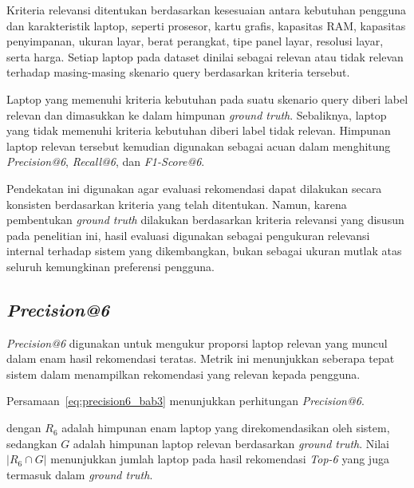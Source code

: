 Kriteria relevansi ditentukan berdasarkan kesesuaian antara kebutuhan pengguna dan karakteristik laptop, seperti prosesor, kartu grafis, kapasitas RAM, kapasitas penyimpanan, ukuran layar, berat perangkat, tipe panel layar, resolusi layar, serta harga. Setiap laptop pada dataset dinilai sebagai relevan atau tidak relevan terhadap masing-masing skenario query berdasarkan kriteria tersebut.

Laptop yang memenuhi kriteria kebutuhan pada suatu skenario query diberi label relevan dan dimasukkan ke dalam himpunan \textit{ground truth}. Sebaliknya, laptop yang tidak memenuhi kriteria kebutuhan diberi label tidak relevan. Himpunan laptop relevan tersebut kemudian digunakan sebagai acuan dalam menghitung \textit{Precision@6}, \textit{Recall@6}, dan \textit{F1-Score@6}.

Pendekatan ini digunakan agar evaluasi rekomendasi dapat dilakukan secara konsisten berdasarkan kriteria yang telah ditentukan. Namun, karena pembentukan \textit{ground truth} dilakukan berdasarkan kriteria relevansi yang disusun pada penelitian ini, hasil evaluasi digunakan sebagai pengukuran relevansi internal terhadap sistem yang dikembangkan, bukan sebagai ukuran mutlak atas seluruh kemungkinan preferensi pengguna.

\subsection{\textit{Precision@6}}
\textit{Precision@6} digunakan untuk mengukur proporsi laptop relevan yang muncul dalam enam hasil rekomendasi teratas. Metrik ini menunjukkan seberapa tepat sistem dalam menampilkan rekomendasi yang relevan kepada pengguna.

Persamaan~\ref{eq:precision6_bab3} menunjukkan perhitungan \textit{Precision@6}.


\noindent dengan $R_6$ adalah himpunan enam laptop yang direkomendasikan oleh sistem, sedangkan $G$ adalah himpunan laptop relevan berdasarkan \textit{ground truth}. Nilai $|R_6 \cap G|$ menunjukkan jumlah laptop pada hasil rekomendasi \textit{Top-6} yang juga termasuk dalam \textit{ground truth}.

